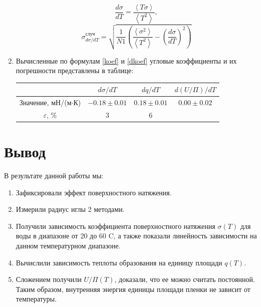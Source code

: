 \documentclass[12pt]{article}
\begin{document}
\begin{enumerate}
        $$    \frac{d\sigma}{dT} = \frac{\left<T\sigma\right>}
                {\left<T^2\right>}, \label{koef} $$
        $$    \sigma_{d\sigma/dT}^{\text{случ}} = \sqrt{\frac{1}{N1}\left(\frac{\left<\sigma^2\right>} {\left<T^2\right>} - \left(\frac{d\sigma}{dT}\right)^2\right)}\label{dkoef}$$

        \item Вычисленные по формулам \ref{koef} и \ref{dkoef}
        угловые коэффициенты и их погрешности
        представлены в таблице:
        \begin{table}[H]
            \centering
            \begin{tabular}{|c|c|c|c|}
                \hline
                 & $d\sigma/dT$ & $dq/dT$ & $d(U/\Pi)/dT$ \\ \hline
                Значение, мН/(м$\cdot$К) & $-0.18 \pm 0.01$ & $0.18\pm 0.01 $ & $0.00 \pm 0.02$ \\ \hline
                $\varepsilon$, \% & 3 & 6 & \\ \hline
            \end{tabular}
        \end{table}

    \end{enumerate}

    \section{Вывод}
    В результате данной работы мы:
    \begin{enumerate}
        \item Зафиксировали эффект поверхностного натяжения.
        \item Измерили радиус иглы 2 методами.
        \item Получили зависимость коэффициента поверхностного натяжения
        $\sigma(T)$ для воды в диапазоне от 20 до 60 \textdegree C, а
        также показали линейность зависимости на данном температурном
        диапазоне.
        \item Вычислили зависимость теплоты образования на единицу площади
        $q(T)$.
        \item Сложением получили $U/\Pi(T)$, доказали, что ее можно считать
        постоянной. Таким образом, внутренняя энергия единицы площади
        пленки не зависит от температуры.
    \end{enumerate}
\end{document}
